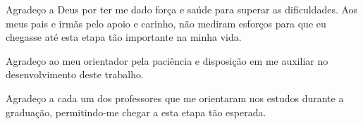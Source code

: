 \begin{agradecimentos}
Agradeço a Deus por ter me dado força e saúde para superar as dificuldades. Aos meus pais e irmãs pelo apoio e carinho, 
não mediram esforços para que eu chegasse até esta etapa tão importante na minha vida.

Agradeço ao meu orientador pela paciência e disposição em me auxiliar no desenvolvimento deste trabalho.

Agradeço a cada um dos professores que me orientaram nos estudos durante a graduação, permitindo-me  
chegar a esta etapa tão esperada.
\end{agradecimentos}

